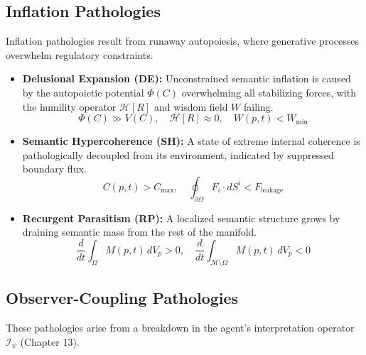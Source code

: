 \subsection{Inflation Pathologies}

Inflation pathologies result from runaway autopoiesis, where generative processes overwhelm regulatory constraints.

\begin{itemize}
    \item \textbf{Delusional Expansion (DE):} Unconstrained semantic inflation is caused by the autopoietic potential \(\Phi(C)\) overwhelming all stabilizing forces, with the humility operator \(\mathcal{H}[R]\) and wisdom field \(W\) failing.
    \begin{equation}
    \Phi(C) \gg V(C), \quad \mathcal{H}[R] \approx 0, \quad W(p,t) < W_{\text{min}}
    \end{equation}

    \item \textbf{Semantic Hypercoherence (SH):} A state of extreme internal coherence is pathologically decoupled from its environment, indicated by suppressed boundary flux.
    \begin{equation}
    C(p,t) > C_{\text{max}}, \quad \oint_{\partial \Omega} F_i \cdot dS^i < F_{\text{leakage}}
    \end{equation}

    \item \textbf{Recurgent Parasitism (RP):} A localized semantic structure grows by draining semantic mass from the rest of the manifold.
    \begin{equation}
    \frac{d}{dt}\int_{\Omega} M(p,t) \, dV_p > 0, \quad \frac{d}{dt}\int_{\mathcal{M}\setminus\Omega} M(p,t) \, dV_p < 0
    \end{equation}
\end{itemize}

\subsection{Observer-Coupling Pathologies}

These pathologies arise from a breakdown in the agent's interpretation operator \(\mathcal{I}_{\psi}\) (Chapter 13).

